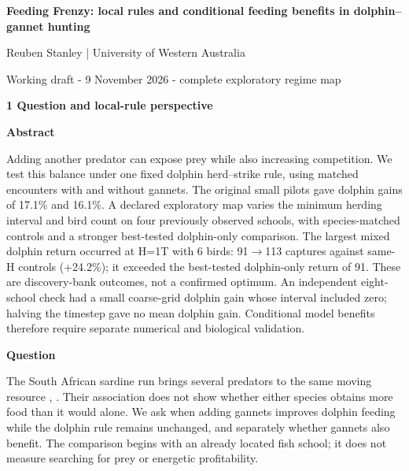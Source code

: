 \documentclass[10pt,a4paper]{article}
\begin{document}
\begin{center}{\LARGE\bfseries Feeding Frenzy: local rules and conditional feeding benefits in dolphin--gannet hunting\par}\vspace{6pt}Reuben Stanley | University of Western Australia\par{\small Working draft - 9 November 2026 - complete exploratory regime map}\end{center}
{\large\bfseries 1 Question and local-rule perspective\par}\vspace{7pt}
\begin{minipage}[t]{238.10999999999999pt}\vspace{0pt}
\textbf{Abstract}\par Adding another predator can expose prey while also increasing competition. We test this balance under one fixed dolphin herd--strike rule, using matched encounters with and without gannets. The original small pilots gave dolphin gains of 17.1\% and 16.1\%. A declared exploratory map varies the minimum herding interval and bird count on four previously observed schools, with species-matched controls and a stronger best-tested dolphin-only comparison. The largest mixed dolphin return occurred at H=1T with 6 birds: 91\ensuremath{\rightarrow}113 captures against same-H controls (+24.2\%); it exceeded the best-tested dolphin-only return of 91. These are discovery-bank outcomes, not a confirmed optimum. An independent eight-school check had a small coarse-grid dolphin gain whose interval included zero; halving the timestep gave no mean dolphin gain. Conditional model benefits therefore require separate numerical and biological validation.\par\smallskip
\textbf{Question}\par The South African sardine run brings several predators to the same moving resource \citep{teske2021}, \citep{odonoghue2009}. Their association does not show whether either species obtains more food than it would alone. We ask when adding gannets improves dolphin feeding while the dolphin rule remains unchanged, and separately whether gannets also benefit. The comparison begins with an already located fish school; it does not measure searching for prey or energetic profitability.\par\smallskip
\end{minipage}
\hfill
\end{document}

